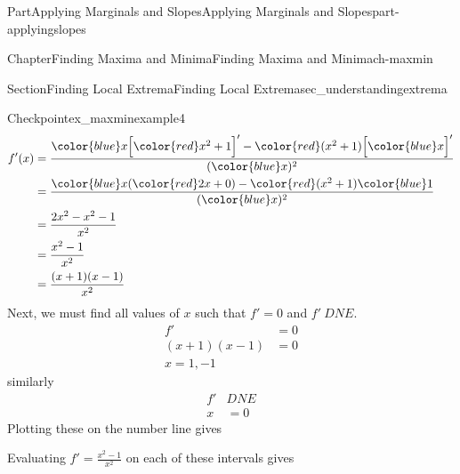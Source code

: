 \documentclass[oneside,10pt,]{tufte-book}
\numberwithin{equation}{chapter}
\newcommand{\red}[1]{   {\color{red}   #1}   }
\newcommand{\blue}[1]{  {\color{blue}  #1}  }
\newcommand{\D}[1]{ \Big[ #1 \Big]'  }
\newcommand{\amp}{&}
\begin{document}
\begin{partptx}{Part}{Applying Marginals and Slopes}{}{Applying Marginals and Slopes}{}{}{part-applyingslopes}
\begin{chapterptx}{Chapter}{Finding Maxima and Minima}{}{Finding Maxima and Minima}{}{}{ch-maxmin}
\begin{sectionptx}{Section}{Finding Local Extrema}{}{Finding Local Extrema}{}{}{sec_understandingextrema}
\begin{inlineexercise}{Checkpoint}{}{ex_maxminexample4}
\begin{align*}
f'(x)  \amp = \dfrac{\blue{x}\D{\red{x^2+1}} - \red{(x^2+1)}\D{\blue{x}} }{(\blue{x})^2}\\
\amp = \dfrac{\blue{x} (\red{2x+0}) - \red{(x^2+1)}\blue{1} }{(\blue{x})^2}\\
\amp = \dfrac{ 2x^2 - x^2 - 1 }{x^2}\\
\amp = \dfrac{ x^2 - 1 }{x^2}\\
\amp = \dfrac{(x+1)(x-1)}{x^2}
\end{align*}
Next, we must find all values of \(x\) such that \(f'=0\) and \(f'\ DNE\).%
\begin{align*}
f' \amp =0 \\
(x+1)(x-1) \amp =0\\
x=1,-1 
\end{align*}
similarly%
\begin{align*}
f' \amp DNE\\
x \amp =0
\end{align*}
Plotting these on the number line gives%
\par
\begin{image}{0.125}{0.75}{0.125}{}%
%
\end{image}%
%
\par
Evaluating \(f' = \frac{x^2-1}{x^2}\) on each of these intervals gives \begin{image}{0.125}{0.75}{0.125}{}%
\end{image}
\end{inlineexercise}
\end{sectionptx}
\end{chapterptx}
\end{partptx}
\end{document}
